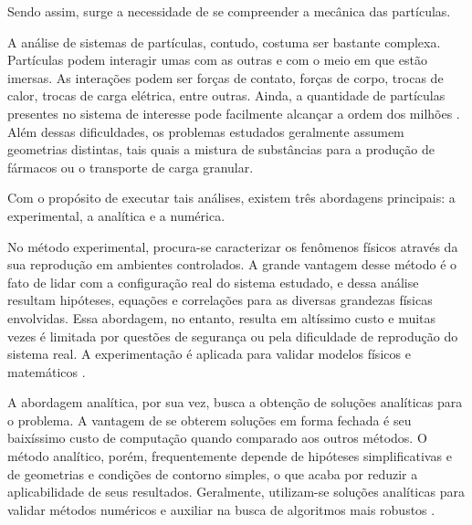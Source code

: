 

Sendo assim, surge a necessidade de se compreender a mecânica das partículas.

A análise de sistemas de partículas, contudo, costuma ser bastante complexa. Partículas podem interagir umas com as outras e com o meio em que estão imersas. As interações podem ser forças de contato, forças de corpo, trocas de calor, trocas de carga elétrica, entre outras. Ainda, a quantidade de partículas presentes no sistema de interesse pode facilmente alcançar a ordem dos milhões \cite{bib:computational_granular_dynamics}. Além dessas dificuldades, os problemas estudados geralmente assumem geometrias distintas, tais quais a mistura de substâncias para a produção de fármacos ou o transporte de carga granular.

Com o propósito de executar tais análises, existem três abordagens principais: a experimental, a analítica e a numérica. 

No método experimental, procura-se caracterizar os fenômenos físicos através da sua reprodução em ambientes controlados. A grande vantagem desse método é o fato de lidar com a configuração real do sistema estudado, e dessa análise resultam hipóteses, equações e correlações para as diversas grandezas físicas envolvidas. Essa abordagem, no entanto, resulta em altíssimo custo e muitas vezes é limitada por questões de segurança ou pela dificuldade de reprodução do sistema real. A experimentação é aplicada para validar modelos físicos e matemáticos \cite{bib:maliska}.

A abordagem analítica, por sua vez, busca a obtenção de soluções analíticas para o problema. A vantagem de se obterem soluções em forma fechada é seu baixíssimo custo de computação quando comparado aos outros métodos. O método analítico, porém, frequentemente depende de hipóteses simplificativas e de geometrias e condições de contorno simples, o que acaba por reduzir a aplicabilidade de seus resultados. Geralmente, utilizam-se soluções analíticas para validar métodos numéricos e auxiliar na busca de algoritmos mais robustos \cite{bib:maliska}.

